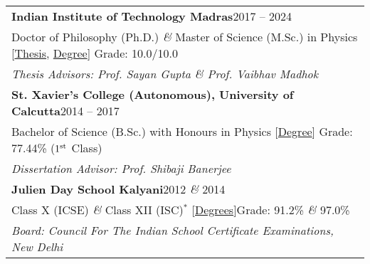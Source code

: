 
\noindent
\begin{tabular}{@{} m{18.5cm}}
\textbf{Indian Institute of Technology Madras}\hfill 2017 -- 2024\\
Doctor of Philosophy (Ph.D.) \textit{\&} Master of Science (M.Sc.) in Physics [\href{https://shodhganga.inflibnet.ac.in/handle/10603/609844}{Thesis}, \href{https://drive.google.com/file/d/1e_EdV3adnDxSkRCMAQGF4_j8DAEQHmok/view?usp=sharing}{Degree}] \hfill Grade: 10.0/10.0\\
\textit{Thesis Advisors: Prof. Sayan Gupta \& Prof. Vaibhav Madhok}\\[0.3cm]

\textbf{St. Xavier's College (Autonomous), University of Calcutta}\hfill 2014 -- 2017\\
Bachelor of Science (B.Sc.) with Honours in Physics [\href{https://drive.google.com/file/d/1kzH1EiCFbbcnvpbOTWJMMhiCC53tkvDD/view?usp=sharing}{Degree}] \hfill Grade: 77.44\% ($1^{\rm st}$ Class)\\
\textit{Dissertation Advisor: Prof. Shibaji Banerjee}\\[0.3cm]

\textbf{Julien Day School Kalyani}\hfill 2012 \textit{\&} 2014\\
Class X (ICSE) \textit{\&} Class XII (ISC)$^{*}$ [\href{https://drive.google.com/file/d/1rBzB5cY0d9NKxEajnIj6dx8uzIBc41sh/view?usp=sharing}{Degrees}]\hfill Grade: 91.2\% \textit{\&} 97.0\%\\
\textit{Board: Council For The Indian School Certificate Examinations, New Delhi}
\end{tabular}